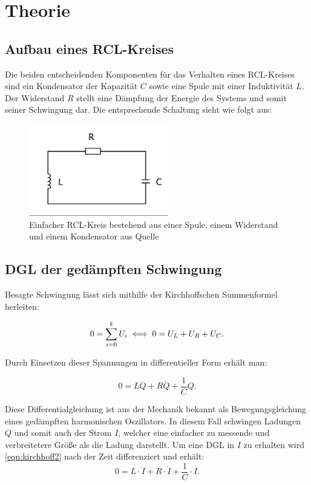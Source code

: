 \section{Theorie}
\label{sec:Theorie}
\subsection{Aufbau eines RCL-Kreises}
Die beiden entscheidenden Komponenten für das Verhalten eines RCL-Kreises sind ein Kondensator der Kapazität $C$ sowie eine Spule mit einer Induktivität $L$.
Der Widerstand $R$ stellt eine Dämpfung der Energie des Systems und somit seiner Schwingung dar. Die entsprechende Schaltung sieht wie folgt aus:

\begin{figure}
  \centering
  \includegraphics[height= 4cm]{./logos/schwingkreis.png}
  \caption{Einfacher RCL-Kreis bestehend aus einer Spule, einem Widerstand und einem Kondensator
  aus Quelle \cite{sample}}
  \label{fig:rcl}
\end{figure}


\subsection{DGL der gedämpften Schwingung}
Besagte Schwingung lässt sich mithilfe der Kirchhoffschen Summenformel herleiten:

\begin{equation}
  0= \sum_{i=0}^{k} U_i \\
  \iff  0 = U_L + U_R + U_C .
  \label{eqn:kirchhoff1}
\end{equation}

Durch Einsetzen dieser Spannungen in differentieller Form erhält man:

\begin{equation}
  0= L\ddot{Q} + R  \dot{Q} + \frac{1}{C} Q .
  \label{eqn:kirchhoff2}
\end{equation}

Diese Differentialgleichung ist aus der Mechanik bekannt als Bewegungsgleichung eines gedämpften harmonischen Oszillators.
In diesem Fall schwingen Ladungen $Q$ und somit auch der Strom $I$, welcher eine einfacher zu messende und verbreitetere Größe als die Ladung darstellt.
Um eine DGL in $I$ zu erhalten wird \eqref{eqn:kirchhoff2} nach der Zeit differenziert und erhält:
\begin{equation}
  0= L \cdot \ddot{I} + R \cdot \dot{I} + \frac{1}{C} \cdot I .
  \label{eqn:kirchhoff3}
\end{equation}


